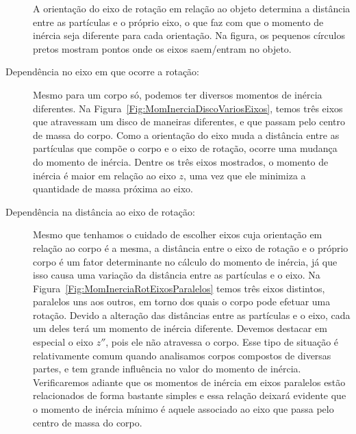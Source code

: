 \begin{description}
\begin{marginfigure}[0.5cm]
\caption{A orientação do eixo de rotação em relação ao objeto determina a distância entre as partículas e o próprio eixo, o que faz com que o momento de inércia seja diferente para cada orientação. Na figura, os pequenos círculos pretos mostram pontos onde os eixos saem/entram no objeto. \label{Fig:MomInerciaDiscoVariosEixos}}
\end{marginfigure}
    \item[Dependência no eixo em que ocorre a rotação:] Mesmo para um corpo só, podemos ter diversos momentos de inércia diferentes. Na Figura~\ref{Fig:MomInerciaDiscoVariosEixos}, temos três eixos que atravessam um disco de maneiras diferentes, e que passam pelo centro de massa do corpo. Como a orientação do eixo muda a distância entre as partículas que compõe o corpo e o eixo de rotação, ocorre uma mudança do momento de inércia. Dentre os três eixos mostrados, o momento de inércia é maior em relação ao eixo $z$, uma vez que ele minimiza a quantidade de massa próxima ao eixo.
    \item[Dependência na distância ao eixo de rotação:] Mesmo que tenhamos o cuidado de escolher eixos cuja orientação em relação ao corpo é a mesma, a distância entre o eixo de rotação e o próprio corpo é um fator determinante no cálculo do momento de inércia, já que isso causa uma variação da distância entre as partículas e o eixo. Na Figura~\ref{Fig:MomInerciaRotEixosParalelos} temos três eixos distintos, paralelos uns aos outros, em torno dos quais o corpo pode efetuar uma rotação. Devido a alteração das distâncias entre as partículas e o eixo, cada um deles terá um momento de inércia diferente. Devemos destacar em especial o eixo $z''$, pois ele não atravessa o corpo. Esse tipo de situação é relativamente comum quando analisamos corpos compostos de diversas partes, e tem grande influência no valor do momento de inércia. Verificaremos adiante que os momentos de inércia em eixos paralelos estão relacionados de forma bastante simples e essa relação deixará evidente que o momento de inércia mínimo é aquele associado ao eixo que passa pelo centro de massa do corpo.
\end{description}

